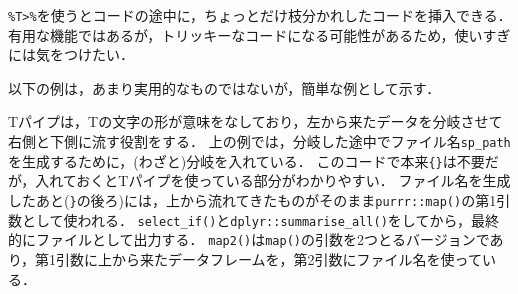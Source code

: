 \documentclass[
]{article}
\newenvironment{Shaded}{\begin{snugshade}}{\end{snugshade}}
\newcommand{\AttributeTok}[1]{\textcolor[rgb]{0.77,0.63,0.00}{#1}}
\newcommand{\CommentTok}[1]{\textcolor[rgb]{0.56,0.35,0.01}{\textit{#1}}}
\newcommand{\DecValTok}[1]{\textcolor[rgb]{0.00,0.00,0.81}{#1}}
\newcommand{\FunctionTok}[1]{\textcolor[rgb]{0.00,0.00,0.00}{#1}}
\newcommand{\NormalTok}[1]{#1}
\newcommand{\OtherTok}[1]{\textcolor[rgb]{0.56,0.35,0.01}{#1}}
\newcommand{\SpecialCharTok}[1]{\textcolor[rgb]{0.00,0.00,0.00}{#1}}
\newcommand{\StringTok}[1]{\textcolor[rgb]{0.31,0.60,0.02}{#1}}
\begin{document}
\texttt{\%T\textgreater{}\%}を使うとコードの途中に，ちょっとだけ枝分かれしたコードを挿入できる．
有用な機能ではあるが，トリッキーなコードになる可能性があるため，使いすぎには気をつけたい．

以下の例は，あまり実用的なものではないが，簡単な例として示す．

\begin{Shaded}
\end{Shaded}

Tパイプは，Tの文字の形が意味をなしており，左から来たデータを分岐させて右側と下側に流す役割をする．
上の例では，分岐した途中でファイル名\texttt{sp\_path}を生成するために，(わざと)分岐を入れている．
このコードで本来\texttt{\{\}}は不要だが，入れておくとTパイプを使っている部分がわかりやすい．
ファイル名を生成したあと(\texttt{\}}の後ろ)には，上から流れてきたものがそのまま\texttt{purrr::map()}の第1引数として使われる．
\texttt{select\_if()}と\texttt{dplyr::summarise\_all()}をしてから，最終的にファイルとして出力する．
\texttt{map2()}は\texttt{map()}の引数を2つとるバージョンであり，第1引数に上から来たデータフレームを，第2引数にファイル名を使っている．
\end{document}
